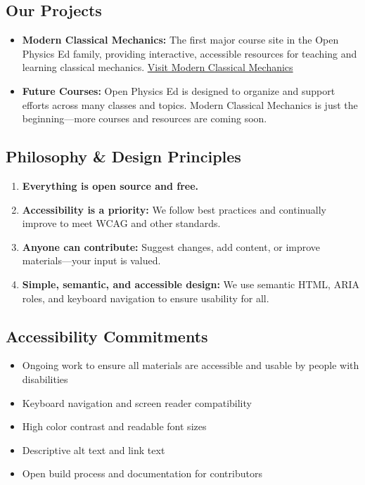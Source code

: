 \subsection{Our Projects}\label{our-projects}

\begin{itemize}
\tightlist
\item
  \textbf{Modern Classical Mechanics:} The first major course site in
  the Open Physics Ed family, providing interactive, accessible
  resources for teaching and learning classical mechanics.
  \href{https://dannycaballero.info/modern-classical-mechanics/}{Visit
  Modern Classical Mechanics}
\item
  \textbf{Future Courses:} Open Physics Ed is designed to organize and
  support efforts across many classes and topics. Modern Classical
  Mechanics is just the beginning---more courses and resources are
  coming soon.
\end{itemize}

\subsection{Philosophy \& Design
Principles}\label{philosophy-design-principles}

\begin{enumerate}
\def\labelenumi{\arabic{enumi}.}
\tightlist
\item
  \textbf{Everything is open source and free.}
\item
  \textbf{Accessibility is a priority:} We follow best practices and
  continually improve to meet WCAG and other standards.
\item
  \textbf{Anyone can contribute:} Suggest changes, add content, or
  improve materials---your input is valued.
\item
  \textbf{Simple, semantic, and accessible design:} We use semantic
  HTML, ARIA roles, and keyboard navigation to ensure usability for all.
\end{enumerate}

\subsection{Accessibility Commitments}\label{accessibility-commitments}

\begin{itemize}
\tightlist
\item
  Ongoing work to ensure all materials are accessible and usable by
  people with disabilities
\item
  Keyboard navigation and screen reader compatibility
\item
  High color contrast and readable font sizes
\item
  Descriptive alt text and link text
\item
  Open build process and documentation for contributors
\end{itemize}

